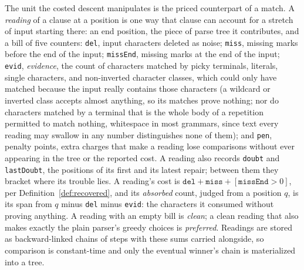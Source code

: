 \documentclass[manuscript]{acmart}
\newcommand{\cd}[1]{\texttt{#1}}
\begin{document}
The unit the costed descent manipulates is the priced counterpart of a match. A \emph{reading} of a clause at a position is one way that clause can account for a stretch of input starting there: an end position, the piece of parse tree it contributes, and a bill of five counters: \cd{del}, input characters deleted as noise; \cd{miss}, missing marks before the end of the input; \cd{missEnd}, missing marks at the end of the input; \cd{evid}, \emph{evidence}, the count of characters matched by picky terminals, literals, single characters, and non-inverted character classes, which could only have matched because the input really contains those characters (a wildcard or inverted class accepts almost anything, so its matches prove nothing; nor do characters matched by a terminal that is the whole body of a repetition permitted to match nothing, whitespace in most grammars, since text every reading may swallow in any number distinguishes none of them); and \cd{pen}, penalty points, extra charges that make a reading lose comparisons without ever appearing in the tree or the reported cost. A reading also records \cd{doubt} and \cd{lastDoubt}, the positions of its first and its latest repair; between them they bracket where its trouble lies. A reading's cost is $\cd{del} + \cd{miss} + [\cd{missEnd} > 0]$, per Definition~\ref{def:recovered}, and its \emph{absorbed} count, judged from a position $q$, is its span from $q$ minus \cd{del} minus \cd{evid}: the characters it consumed without proving anything. A reading with an empty bill is \emph{clean}; a clean reading that also makes exactly the plain parser's greedy choices is \emph{preferred}. Readings are stored as backward-linked chains of steps with these sums carried alongside, so comparison is constant-time and only the eventual winner's chain is materialized into a tree.
\end{document}
